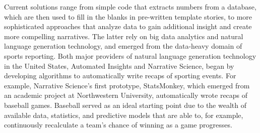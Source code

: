 \documentclass[notoc, symmetric, nobib, nols]{towcenter-guideto-book}
\begin{document}
Current solutions range from simple code that extracts numbers from a database, which are then used to fill in the blanks in pre-written template stories, to more sophisticated approaches that analyze data to gain additional insight and create more compelling narratives. The latter rely on big data analytics and natural language generation technology, and emerged from the data-heavy domain of sports reporting. Both major providers of natural language generation technology in the United States, Automated Insights and Narrative Science, began by developing algorithms to automatically write recaps of sporting events. For example, Narrative Science's first prototype, StatsMonkey, which emerged from an academic project at Northwestern University, automatically wrote recaps of baseball games.\autocite{levy12} Baseball served as an ideal starting point due to the wealth of available data, statistics, and predictive models that are able to, for example, continuously recalculate a team's chance of winning as a game progresses. 
\end{document}
